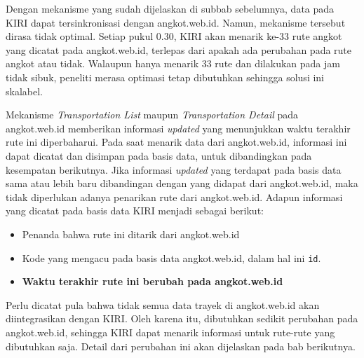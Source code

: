 Dengan mekanisme yang sudah dijelaskan di subbab sebelumnya, data pada KIRI dapat tersinkronisasi dengan angkot.web.id. Namun, mekanisme tersebut dirasa tidak optimal. Setiap pukul 0.30, KIRI akan menarik ke-33 rute angkot yang dicatat pada angkot.web.id, terlepas dari apakah ada perubahan pada rute angkot atau tidak. Walaupun hanya menarik 33 rute dan dilakukan pada jam tidak sibuk, peneliti merasa optimasi tetap dibutuhkan sehingga solusi ini skalabel.

Mekanisme \textit{Transportation List} maupun \textit{Transportation Detail} pada angkot.web.id memberikan informasi \textit{updated} yang menunjukkan waktu terakhir rute ini diperbaharui. Pada saat menarik data dari angkot.web.id, informasi ini dapat dicatat dan disimpan pada basis data, untuk dibandingkan pada kesempatan berikutnya. Jika informasi \textit{updated} yang terdapat pada basis data sama atau lebih baru dibandingan dengan yang didapat dari angkot.web.id, maka tidak diperlukan adanya penarikan rute dari angkot.web.id. Adapun informasi yang dicatat pada basis data KIRI menjadi sebagai berikut:

\begin{itemize}
	\item Penanda bahwa rute ini ditarik dari angkot.web.id
	\item Kode yang mengacu pada basis data angkot.web.id, dalam hal ini \verb/id/.
	\item \textbf{Waktu terakhir rute ini berubah pada angkot.web.id}
\end{itemize}

Perlu dicatat pula bahwa tidak semua data trayek di angkot.web.id akan diintegrasikan dengan KIRI. Oleh karena itu, dibutuhkan sedikit perubahan pada angkot.web.id, sehingga KIRI dapat menarik informasi untuk rute-rute yang dibutuhkan saja. Detail dari perubahan ini akan dijelaskan pada bab berikutnya.